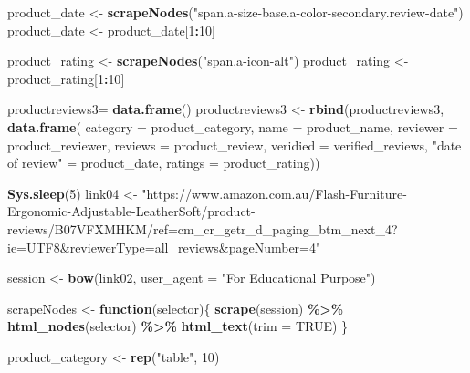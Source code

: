 \documentclass[
]{article}
\newenvironment{Shaded}{\begin{snugshade}}{\end{snugshade}}
\newcommand{\AttributeTok}[1]{\textcolor[rgb]{0.13,0.29,0.53}{#1}}
\newcommand{\ConstantTok}[1]{\textcolor[rgb]{0.56,0.35,0.01}{#1}}
\newcommand{\ControlFlowTok}[1]{\textcolor[rgb]{0.13,0.29,0.53}{\textbf{#1}}}
\newcommand{\DecValTok}[1]{\textcolor[rgb]{0.00,0.00,0.81}{#1}}
\newcommand{\FunctionTok}[1]{\textcolor[rgb]{0.13,0.29,0.53}{\textbf{#1}}}
\newcommand{\NormalTok}[1]{#1}
\newcommand{\OtherTok}[1]{\textcolor[rgb]{0.56,0.35,0.01}{#1}}
\newcommand{\SpecialCharTok}[1]{\textcolor[rgb]{0.81,0.36,0.00}{\textbf{#1}}}
\newcommand{\StringTok}[1]{\textcolor[rgb]{0.31,0.60,0.02}{#1}}
\begin{document}
\begin{Shaded}
\begin{Highlighting}[]
\NormalTok{  product\_date }\OtherTok{\textless{}{-}} \FunctionTok{scrapeNodes}\NormalTok{(}\StringTok{"span.a{-}size{-}base.a{-}color{-}secondary.review{-}date"}\NormalTok{)}
\NormalTok{  product\_date }\OtherTok{\textless{}{-}}\NormalTok{ product\_date[}\DecValTok{1}\SpecialCharTok{:}\DecValTok{10}\NormalTok{]}
  
\NormalTok{  product\_rating }\OtherTok{\textless{}{-}} \FunctionTok{scrapeNodes}\NormalTok{(}\StringTok{"span.a{-}icon{-}alt"}\NormalTok{)}
\NormalTok{  product\_rating }\OtherTok{\textless{}{-}}\NormalTok{ product\_rating[}\DecValTok{1}\SpecialCharTok{:}\DecValTok{10}\NormalTok{]}
  
\NormalTok{  productreviews3}\OtherTok{=} \FunctionTok{data.frame}\NormalTok{()}
\NormalTok{  productreviews3 }\OtherTok{\textless{}{-}} \FunctionTok{rbind}\NormalTok{(productreviews3, }\FunctionTok{data.frame}\NormalTok{(}
                      \AttributeTok{category =}\NormalTok{ product\_category,}
                      \AttributeTok{name =}\NormalTok{ product\_name,}
                      \AttributeTok{reviewer =}\NormalTok{ product\_reviewer,}
                      \AttributeTok{reviews =}\NormalTok{ product\_review,}
                      \AttributeTok{veridied =}\NormalTok{ verified\_reviews,}
                      \StringTok{"date of review"} \OtherTok{=}\NormalTok{ product\_date,}
                      \AttributeTok{ratings =}\NormalTok{ product\_rating))}
  
   \FunctionTok{Sys.sleep}\NormalTok{(}\DecValTok{5}\NormalTok{)}
\NormalTok{link04 }\OtherTok{\textless{}{-}} \StringTok{"https://www.amazon.com.au/Flash{-}Furniture{-}Ergonomic{-}Adjustable{-}LeatherSoft/product{-}reviews/B07VFXMHKM/ref=cm\_cr\_getr\_d\_paging\_btm\_next\_4?ie=UTF8\&reviewerType=all\_reviews\&pageNumber=4"}


\NormalTok{  session }\OtherTok{\textless{}{-}} \FunctionTok{bow}\NormalTok{(link02,}
               \AttributeTok{user\_agent =} \StringTok{"For Educational Purpose"}\NormalTok{)}

\NormalTok{  scrapeNodes }\OtherTok{\textless{}{-}} \ControlFlowTok{function}\NormalTok{(selector)\{}
    \FunctionTok{scrape}\NormalTok{(session) }\SpecialCharTok{\%\textgreater{}\%}
      \FunctionTok{html\_nodes}\NormalTok{(selector) }\SpecialCharTok{\%\textgreater{}\%}
      \FunctionTok{html\_text}\NormalTok{(}\AttributeTok{trim =} \ConstantTok{TRUE}\NormalTok{)}
\NormalTok{  \}}

\NormalTok{  product\_category }\OtherTok{\textless{}{-}} \FunctionTok{rep}\NormalTok{(}\StringTok{"table"}\NormalTok{, }\DecValTok{10}\NormalTok{)}


\end{Highlighting}
\end{Shaded}
\end{document}
